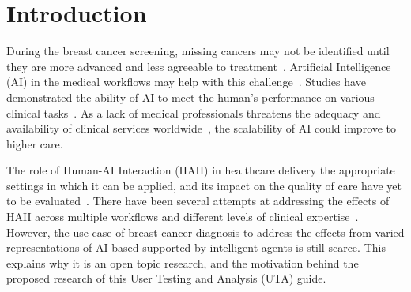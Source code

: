 
\section{Introduction}
\label{sec:sec001}


During the breast cancer screening, missing cancers may not be identified until they are more advanced and less agreeable to treatment~\cite{Houssami2017}.
Artificial Intelligence (AI) in the medical workflows may help with this challenge~\cite{McKinney2020}.
Studies have demonstrated the ability of AI to meet the human's performance on various clinical tasks~\cite{info:doi/10.2196/10010, Topol2019}.
As a lack of medical professionals threatens the adequacy and availability of clinical services worldwide~\cite{doi:10.1002/j.2051-3909.2012.tb00169.x, rimmer2017radiologist}, the scalability of AI could improve to higher care.

The role of Human-AI Interaction (HAII) in healthcare delivery the appropriate settings in which it can be applied, and its impact on the quality of care have yet to be evaluated~\cite{Tschandl2020}.
There have been several attempts at addressing the effects of HAII across multiple workflows and different levels of clinical expertise~\cite{doi:10.1148/radiol.2019182627, doi:10.1148/ryai.2020200057}.
However, the use case of breast cancer diagnosis to address the effects from varied representations of AI-based supported by intelligent agents is still scarce.
This explains why it is an open topic research, and the motivation behind the proposed research of this User Testing and Analysis (UTA) guide.